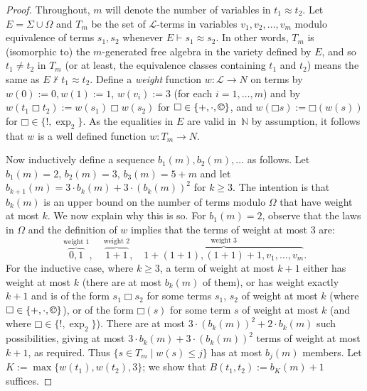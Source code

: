 \documentclass[10pt,a4paper]{amsart}
\newcommand{\bbox}{\mathbin{\Box}}
\newcommand{\cc}{\mathbin{\textup{\copyright}}}
\begin{document}
\begin{proof}
Throughout, $m$ will denote the number of variables in $t_1\approx t_2$.
Let $E= \Sigma\cup\Omega$ and $T_m$ be the set of $\mathscr{L}$-terms in variables $v_1,v_2, \dots ,v_m$ modulo equivalence of terms $s_1,s_2$ whenever $E \vdash s_1\approx s_2$.  In other words, $T_m$ is (isomorphic to) the $m$-generated free algebra in the variety defined by $E$, and so $t_1 \neq t_2$ in $T_m$ (or at least, the equivalence classes containing $t_1$ and $t_2$) means the same as $E\nvdash t_1\approx t_2$. 
Define a \emph{weight} function $w: \mathscr{L} \rightarrow N$ on terms by $w(0):=0 ,w(1):=1$, $w(v_i):=3$ (for each $i=1,\dots,m$) and by $w(t_1 \bbox t_2):=w(s_1)\bbox w(s_2)$ for $\bbox \in \{+,\cdot,\cc\}$, and $w(\bbox s):=\bbox(w(s))$ for $\bbox\in \{!,\exp_2\}$.  As the equalities in $E$ are valid in~$\mathbb{N}$ by assumption, it follows that $w$ is a well defined function $w: T_m \rightarrow N$.
  
Now inductively define a sequence $b_1(m),b_2(m),\dots$ as follows. Let $b_1(m)=2$, $b_2(m)=3$, $b_3(m)=5+m$ and let  $b_{k+1}(m)=3\cdot b_k(m)+3 \cdot (b_k(m))^2$ for $k\geq 3$.  
The intention is that $b_k(m)$ is an upper bound on the number of terms modulo $\Omega$ that have weight at most $k$.  
We now explain why this is so.   
For $b_1(m)=2$, observe that the laws in $\Omega$ and the definition of $w$ implies that the terms of weight at most $3$ are:
\[
\stackrel{\text{weight 1}}{\overbrace{0, 1}},\quad  \stackrel{\text{weight 2}}{\overbrace{1+1}},\quad  \stackrel{\text{weight 3}}{\overbrace{1+(1+1),(1+1)+1,v_1,\dots,v_m}}.
\]
For the inductive case, where $k\geq 3$, a term of weight at most $k+1$ either has weight at most $k$ (there are at most $b_k(m)$ of them), or has weight exactly $k+1$ and is of the form $s_1 \bbox s_2$ for some terms $s_1$, $s_2$ of weight at most $k$ (where $\bbox \in \{+,\cdot,\cc\}$),  or of the form $\bbox(s)$ for some term $s$ of weight at most $k$ (and where $\bbox\in \{!,\exp_2\}$).  
There are at most $3 \cdot (b_k(m))^2+2\cdot b_k(m)$ such possibilities, giving at most $3\cdot b_k(m)+3 \cdot (b_k(m))^2$ terms of weight at most $k+1$, as required.
Thus $\{s \in T_m \mid w(s)\leq j\}$ has at most $b_j(m)$ members. 
Let $K:=\max\{w(t_1),w(t_2),3\}$; we show that $B(t_1,t_2):=b_K(m)+1$ suffices.


\end{proof}
\end{document}
